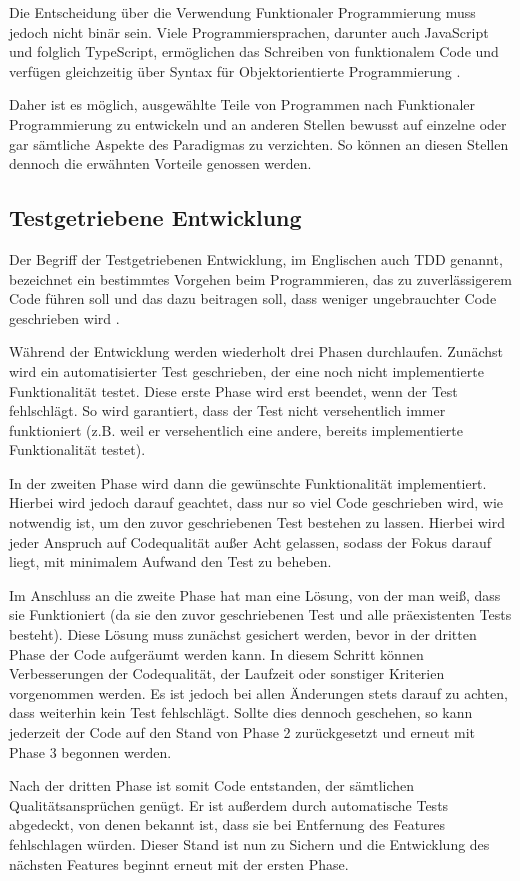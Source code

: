 Die Entscheidung über die Verwendung Funktionaler Programmierung muss jedoch nicht binär sein. Viele Programmiersprachen, darunter auch JavaScript und folglich TypeScript, ermöglichen das Schreiben von funktionalem Code und verfügen gleichzeitig über Syntax für Objektorientierte Programmierung \citep{benton2016js_functional}.

Daher ist es möglich, ausgewählte Teile von Programmen nach Funktionaler Programmierung zu entwickeln und an anderen Stellen bewusst auf einzelne oder gar sämtliche Aspekte des Paradigmas zu verzichten. So können an diesen Stellen dennoch die erwähnten Vorteile genossen werden.

\subsection{Testgetriebene Entwicklung}
\label{state_of_the_art:tdd}
Der Begriff der Testgetriebenen Entwicklung, im Englischen auch \gls{TDD} genannt, bezeichnet ein bestimmtes Vorgehen beim Programmieren, das zu zuverlässigerem Code führen soll und das dazu beitragen soll, dass weniger ungebrauchter Code geschrieben wird \cite{tdd_beck}.

Während der Entwicklung werden wiederholt drei Phasen durchlaufen. Zunächst wird ein automatisierter Test geschrieben, der eine noch nicht implementierte Funktionalität testet. Diese erste Phase wird erst beendet, wenn der Test fehlschlägt. So wird garantiert, dass der Test nicht versehentlich immer funktioniert (z.B. weil er versehentlich eine andere, bereits implementierte Funktionalität testet).

In der zweiten Phase wird dann die gewünschte Funktionalität implementiert. Hierbei wird jedoch darauf geachtet, dass nur so viel Code geschrieben wird, wie notwendig ist, um den zuvor geschriebenen Test bestehen zu lassen. Hierbei wird jeder Anspruch auf Codequalität außer Acht gelassen, sodass der Fokus darauf liegt, mit minimalem Aufwand den Test zu beheben.

Im Anschluss an die zweite Phase hat man eine Lösung, von der man weiß, dass sie Funktioniert (da sie den zuvor geschriebenen Test und alle präexistenten Tests besteht). Diese Lösung muss zunächst gesichert werden, bevor in der dritten Phase der Code aufgeräumt werden kann. In diesem Schritt können Verbesserungen der Codequalität, der Laufzeit oder sonstiger Kriterien vorgenommen werden. Es ist jedoch bei allen Änderungen stets darauf zu achten, dass weiterhin kein Test fehlschlägt. Sollte dies dennoch geschehen, so kann jederzeit der Code auf den Stand von Phase 2 zurückgesetzt und erneut mit Phase 3 begonnen werden.

Nach der dritten Phase ist somit Code entstanden, der sämtlichen Qualitätsansprüchen genügt. Er ist außerdem durch automatische Tests abgedeckt, von denen bekannt ist, dass sie bei Entfernung des Features fehlschlagen würden. Dieser Stand ist nun zu Sichern und die Entwicklung des nächsten Features beginnt erneut mit der ersten Phase.
